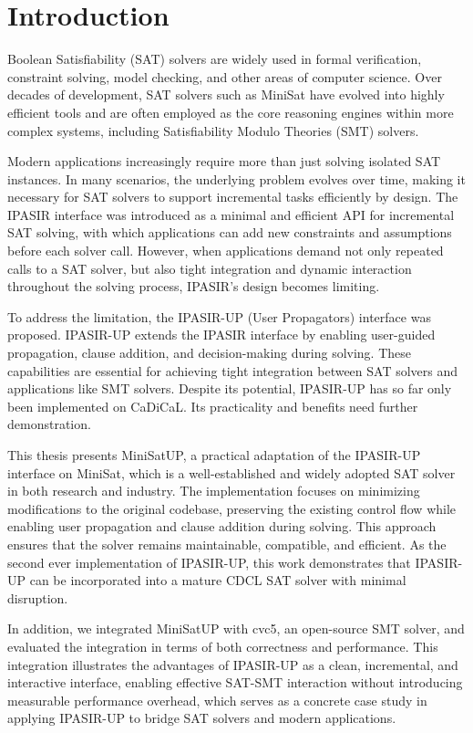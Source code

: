 \chapter{Introduction}

Boolean Satisfiability (SAT) solvers are widely used in formal verification, constraint solving, model checking, and other areas of computer science. Over decades of development, SAT solvers such as MiniSat have evolved into highly efficient tools and are often employed as the core reasoning engines within more complex systems, including Satisfiability Modulo Theories (SMT) solvers.

Modern applications increasingly require more than just solving isolated SAT instances. In many scenarios, the underlying problem evolves over time, making it necessary for SAT solvers to support incremental tasks efficiently by design. The IPASIR interface was introduced as a minimal and efficient API for incremental SAT solving, with which applications can add new constraints and assumptions before each solver call. However, when applications demand not only repeated calls to a SAT solver, but also tight integration and dynamic interaction throughout the solving process, IPASIR's design becomes limiting.

To address the limitation, the IPASIR-UP (User Propagators) interface was proposed. IPASIR-UP extends the IPASIR interface by enabling user-guided propagation, clause addition, and decision-making during solving. These capabilities are essential for achieving tight integration between SAT solvers and applications like SMT solvers. Despite its potential, IPASIR-UP has so far only been implemented on CaDiCaL. Its practicality and benefits need further demonstration.

This thesis presents MiniSatUP, a practical adaptation of the IPASIR-UP interface on MiniSat, which is a well-established and widely adopted SAT solver in both research and industry. The implementation focuses on minimizing modifications to the original codebase, preserving the existing control flow while enabling user propagation and clause addition during solving. This approach ensures that the solver remains maintainable, compatible, and efficient. As the second ever implementation of IPASIR-UP, this work demonstrates that IPASIR-UP can be incorporated into a mature CDCL SAT solver with minimal disruption.

In addition, we integrated MiniSatUP with cvc5, an open-source SMT solver, and evaluated the integration in terms of both correctness and performance. This integration illustrates the advantages of IPASIR-UP as a clean, incremental, and interactive interface, enabling effective SAT-SMT interaction without introducing measurable performance overhead, which serves as a concrete case study in applying IPASIR-UP to bridge SAT solvers and modern applications.

